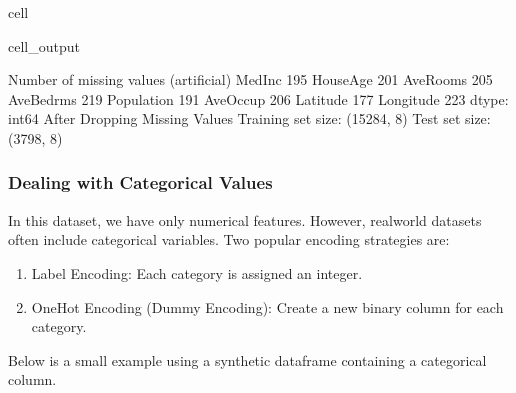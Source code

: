 \documentclass[letterpaper,10pt,english]{jupyterBook}
\begin{document}
\begin{sphinxuseclass}{cell}
\begin{sphinxVerbatimOutput}
\begin{sphinxuseclass}{cell_output}
\begin{sphinxVerbatim}[commandchars=\\\{\}]
\PYGZhy{}\PYGZhy{}\PYGZhy{} Number of missing values (artificial) \PYGZhy{}\PYGZhy{}\PYGZhy{}
MedInc        195
HouseAge      201
AveRooms      205
AveBedrms     219
Population    191
AveOccup      206
Latitude      177
Longitude     223
dtype: int64
\PYGZhy{}\PYGZhy{}\PYGZhy{} After Dropping Missing Values \PYGZhy{}\PYGZhy{}\PYGZhy{}
Training set size: (15284, 8)
Test set size: (3798, 8)
\end{sphinxVerbatim}

\end{sphinxuseclass}\end{sphinxVerbatimOutput}

\end{sphinxuseclass}

\subsubsection{Dealing with Categorical Values}
\label{\detokenize{03:dealing-with-categorical-values}}
\sphinxAtStartPar
In this dataset, we have only numerical features. However, real\sphinxhyphen{}world datasets often include categorical variables. Two popular encoding strategies are:
\begin{enumerate}
%
\item {} 
\sphinxAtStartPar
Label Encoding: Each category is assigned an integer.

\item {} 
\sphinxAtStartPar
One\sphinxhyphen{}Hot Encoding (Dummy Encoding): Create a new binary column for each category.

\end{enumerate}

\sphinxAtStartPar
Below is a small example using a synthetic dataframe containing a categorical column.
\end{document}
